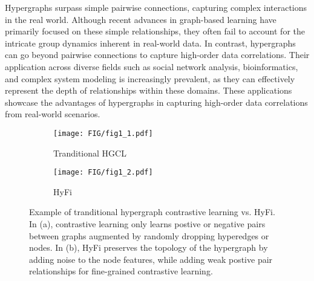 Hypergraphs surpass simple pairwise connections, capturing complex interactions in the real world\cite{yang2022semi, he2023robust, yang2023group, luo2022dualgraph, xie2022contrastive, zhu2021inhomogeneous, saifuddin2023hygnn, li2023coclep, yin2022dynamic}. Although recent advances in graph-based learning have primarily focused on these simple relationships, they often fail to account for the intricate group dynamics inherent in real-world data. In contrast, hypergraphs can go beyond pairwise connections to capture high-order data correlations. Their application across diverse fields such as social network analysis\cite{yang2019revisiting, sun2022ms, sun2023self}, bioinformatics\cite{saifuddin2023seq, zhang2022multiscale, you2022cross, liu2022generating}, and complex system modeling is increasingly prevalent, as they can effectively represent the depth of relationships within these domains. These applications showcase the advantages of hypergraphs in capturing high-order data correlations from real-world scenarios\cite{li2021hyperbolic, vijaikumar2021hypertenet, xia2021self, gu2020quantum, liu2023self}.



\begin{figure}[t!]
  \centering
  \begin{subfigure}[b]{0.56\columnwidth}
    \texttt{[image: FIG/fig1\_1.pdf]}
    \caption{Tranditional HGCL}
  \end{subfigure}
  \begin{subfigure}[b]{0.39\columnwidth}
    \texttt{[image: FIG/fig1\_2.pdf]}
    \caption{HyFi}
  \end{subfigure}
  \caption{Example of tranditional hypergraph contrastive learning vs. HyFi. In (a), contrastive learning only learns postive or negative pairs between graphs augmented by randomly dropping hyperedges or nodes. In (b), HyFi preserves the topology of the hypergraph by adding noise to the node features, while adding weak postive pair relationships for fine-grained contrastive learning.}
  \label{fig1}
\end{figure}


